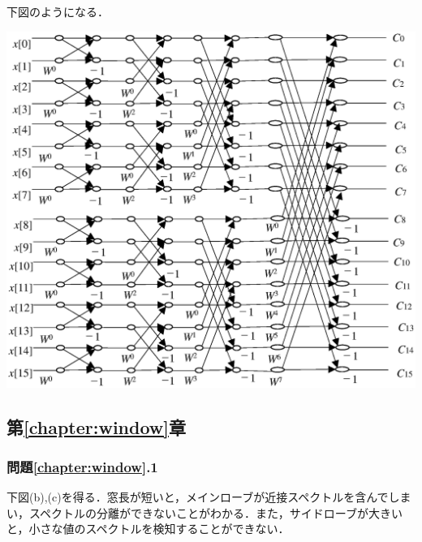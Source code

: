 下図のようになる．

\begin{center}
\includegraphics[width=.5\textwidth]{fig/zu-11e-1.eps}
\end{center}


\subsection*{第\ref{chapter:window}章}

\subsubsection*{問題\ref{chapter:window}.1}

下図(b),(c)を得る．窓長が短いと，メインローブが近接スペクトルを含んでしまい，スペクトルの分離ができないことがわかる．また，サイドローブが大きいと，小さな値のスペクトルを検知することができない．

